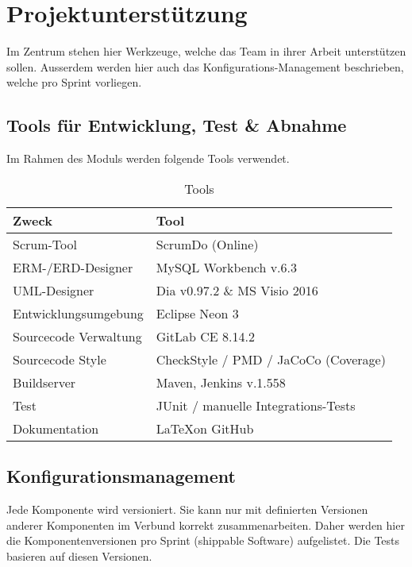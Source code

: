 \section{Projektunterstützung}
Im Zentrum stehen hier Werkzeuge, welche das Team in ihrer Arbeit unterstützen sollen.
Ausserdem werden hier auch das Konfigurations-Management beschrieben, welche pro Sprint vorliegen.
\subsection{Tools für Entwicklung, Test \& Abnahme}
Im Rahmen des Moduls werden folgende Tools verwendet.
\begin{table}[H]
\begin{tabular}{ | p{} | p{} | }
\hline \rowcolor{gray!50}
	\textbf{Zweck} 		 &
	\textbf{Tool}
	\\	\hline
	Scrum-Tool 	&
	ScrumDo (Online)
	\\  \hline	%
	ERM-/ERD-Designer 		&
	MySQL Workbench v.6.3
	\\  \hline	%
	UML-Designer 		&
	Dia v0.97.2 \& MS Visio 2016
	\\  \hline	%
	Entwicklungsumgebung 		&
	Eclipse Neon 3
	\\  \hline	%
	Sourcecode Verwaltung 		&
	GitLab CE 8.14.2
	\\  \hline	%
	Sourcecode Style 		&
	CheckStyle / PMD / JaCoCo (Coverage)
	\\  \hline	%
	Buildserver 		&
	Maven, Jenkins v.1.558
	\\  \hline	%
	Test 		&
	JUnit / manuelle Integrations-Tests
	\\  \hline	%
	Dokumentation 		&
	\LaTeX  on GitHub
	\\  \hline	%
\end{tabular}
\label{tab:tooling}
\caption{Tools}
\end{table}


\subsection{Konfigurationsmanagement}
Jede Komponente wird versioniert. Sie kann nur mit definierten Versionen anderer Komponenten im Verbund korrekt zusammenarbeiten. Daher werden hier die Komponentenversionen pro Sprint (shippable Software) aufgelistet. Die Tests basieren auf diesen Versionen.
